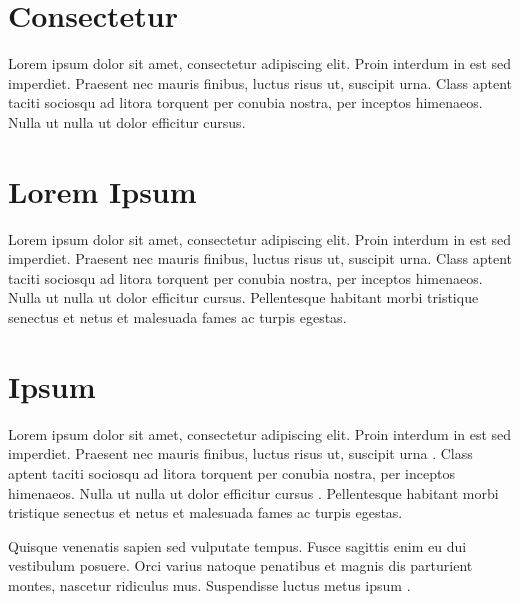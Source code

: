 \section{Consectetur}

Lorem ipsum dolor sit amet, consectetur adipiscing elit. Proin interdum in est sed imperdiet. Praesent nec mauris finibus, luctus risus ut, suscipit urna. Class aptent taciti sociosqu ad litora torquent per conubia nostra, per inceptos himenaeos. Nulla ut nulla ut dolor efficitur cursus.

\section{Lorem Ipsum}

Lorem ipsum dolor sit amet, consectetur adipiscing elit. Proin interdum in est sed imperdiet. Praesent nec mauris finibus, luctus risus ut, suscipit urna. Class aptent taciti sociosqu ad litora torquent per conubia nostra, per inceptos himenaeos. Nulla ut nulla ut dolor efficitur cursus. Pellentesque habitant morbi tristique senectus et netus et malesuada fames ac turpis egestas.

\section{Ipsum}

Lorem ipsum dolor sit amet, consectetur adipiscing elit. Proin interdum in est sed imperdiet. Praesent nec mauris finibus, luctus risus ut, suscipit urna \cite{mcgaughey2019phonon,jiang2015graphene,khan2015equilibrium}. Class aptent taciti sociosqu ad litora torquent per conubia nostra, per inceptos himenaeos. Nulla ut nulla ut dolor efficitur cursus \cite{moore1998cramming}. Pellentesque habitant morbi tristique senectus et netus et malesuada fames ac turpis egestas.

Quisque venenatis sapien sed vulputate tempus. Fusce sagittis enim eu dui vestibulum posuere. Orci varius natoque penatibus et magnis dis parturient montes, nascetur ridiculus mus. Suspendisse luctus metus ipsum \cite{wang2020frank,zhang2020molecular}.